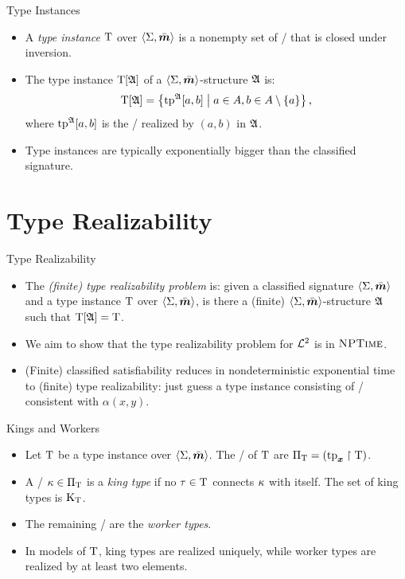 \documentclass{beamer}
\begin{document}
\begin{frame}{Type Instances}
\begin{itemize}
\item A \emph{type instance} $\mathrm{T}$ over $\left\langle \Sigma,\bar{\bm{m}} \right\rangle$ is a nonempty set of
\twotypes/ that is closed under inversion.
\item The type instance $\mathrm{T}[\mathfrak{A}]$ of a $\left\langle \Sigma,\bar{\bm{m}} \right\rangle$-structure $\mathfrak{A}$
is:
\[
  \mathrm{T}[\mathfrak{A}] = \left\{\operatorname{tp}^{\mathfrak{A}}[a,b]\mathrel{}\middle|\mathrel{}a\in A,b\in A\setminus\left\{a\right\}\right\},
\]
where $\operatorname{tp}^{\mathfrak{A}}[a,b]$ is the \twotype/ realized by $(a,b)$ in $\mathfrak{A}$.
\item Type instances are typically exponentially bigger than the classified
signature.
\end{itemize}
\end{frame}

\section{Type Realizability}
\begin{frame}{Type Realizability}
\begin{itemize}
  \item 
  The \emph{(finite) type realizability problem} is: given a classified signature
  $\left\langle \Sigma,\bar{\bm{m}} \right\rangle$ and a type instance $\mathrm{T}$ over $\left\langle \Sigma,\bar{\bm{m}} \right\rangle$, is there a
  (finite) $\left\langle \Sigma,\bar{\bm{m}} \right\rangle$-structure $\mathfrak{A}$ such that $\mathrm{T}[\mathfrak{A}] = \mathrm{T}$.
  \item We aim to show that the type realizability problem for $\mathcal{L}^{2}$ is in
  $\text{\normalfont{\scshape NPTime}}$.
  \item (Finite) classified satisfiability reduces in nondeterministic
  exponential time to (finite) type realizability: just guess a type instance
  consisting of \twotypes/ consistent with $\alpha(x,y)$.
\end{itemize}
\end{frame}

\begin{frame}{Kings and Workers}
\begin{itemize}
  \item 
  Let $\mathrm{T}$ be a type instance over $\left\langle \Sigma,\bar{\bm{m}} \right\rangle$.
  The \onetypes/ of $\mathrm{T}$ are ${\Pi}_{\mathrm{T}} = (\mathrm{tp}_{\bm{x}}\restriction\mathrm{T})$.
  
  \item
  A \onetype/ $\kappa\in {\Pi}_{\mathrm{T}}$ is a \emph{king type} if no $\tau\in\mathrm{T}$ connects
  $\kappa$ with itself. The set of king types is ${\mathrm{K}}_{\mathrm{T}}$.
  
  \item
  The remaining \onetypes/ are the \emph{worker types}.
  
  \item In models of $\mathrm{T}$, king types are realized uniquely, while worker types
  are realized by at least two elements.
\end{itemize}
\end{frame}
\end{document}
